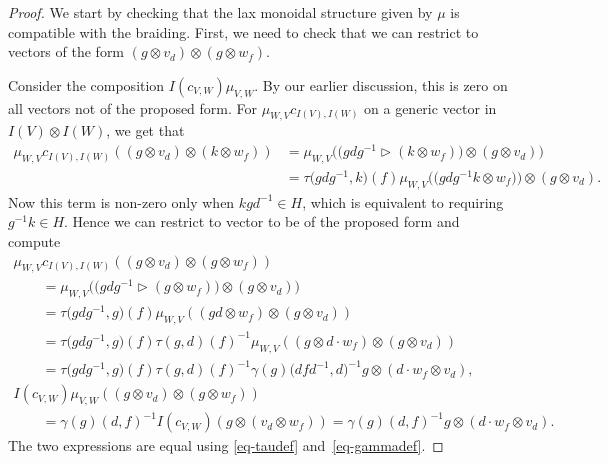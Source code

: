 \documentclass[10pt,a4paper]{amsart}
\numberwithin{equation}{section}
\newcommand{\rI}{I}
\begin{document}
\begin{proof}
We start by checking that the lax monoidal structure given by $\mu$ is compatible with the braiding. First, we need to check that we can restrict to vectors of the form $ ( g \otimes v_d ) \otimes (g \otimes w_f)$.

Consider the composition $\rI(c_{V,W})\mu_{V,W}$. By our earlier discussion, this is zero on all vectors not of the proposed form. For $\mu_{W,V}c_{\rI(V),\rI(W)}$ on a generic vector in $\rI(V) \otimes \rI(W)$, we get that
\begin{align*}
\mu_{W,V}c_{\rI(V),\rI(W)}(( g \otimes v_d ) \otimes (k \otimes w_f)) &= \mu_{W,V} \big(\big( gdg^{-1} \vartriangleright (k \otimes w_f)\big) \otimes (g \otimes v_d)\big) \\
 &= \tau\big(gdg^{-1},k\big)(f) \mu_{W,V} \big(\big( gdg^{-1}k \otimes w_f\big)\big) \otimes (g \otimes v_d).
\end{align*}
Now this term is non-zero only when $kgd^{-1} \in H$, which is equivalent to requiring $g^{-1}k \in H$. Hence we can restrict to vector to be of the proposed form and compute
\begin{gather*}
 \mu_{W,V}c_{\rI(V),\rI(W)}(( g \otimes v_d ) \otimes (g \otimes w_f)) \\
 \qquad{} = \mu_{W,V} \big(\big( gdg^{-1} \vartriangleright (g \otimes w_f)\big) \otimes (g \otimes v_d)\big) \\
 \qquad{} = \tau\big(gdg^{-1},g\big)(f) \mu_{W,V} ((gd \otimes w_f) \otimes (g \otimes v_d)) \\
\qquad{} = \tau\big(gdg^{-1},g\big)(f)\tau(g,d)(f)^{-1} \mu_{W,V} ((g \otimes d \cdot w_f) \otimes (g \otimes v_d))\\
\qquad{}{}=\tau\big(gdg^{-1},g\big)(f)\tau(g,d)(f)^{-1} \gamma(g)\big(dfd^{-1},d\big)^{-1} g \otimes (d \cdot w_f \otimes v_d),\\
 \rI(c_{V,W})\mu_{V,W} (( g \otimes v_d ) \otimes (g \otimes w_f)) \\
 \qquad{} = \gamma(g)(d,f)^{-1} \rI(c_{V,W}) (g \otimes (v_d \otimes w_f)) = \gamma(g)(d,f)^{-1} g \otimes (d \cdot w_f \otimes v_d).
\end{gather*}
The two expressions are equal using \eqref{eq-taudef} and~\eqref{eq-gammadef}.


\end{proof}
\end{document}
